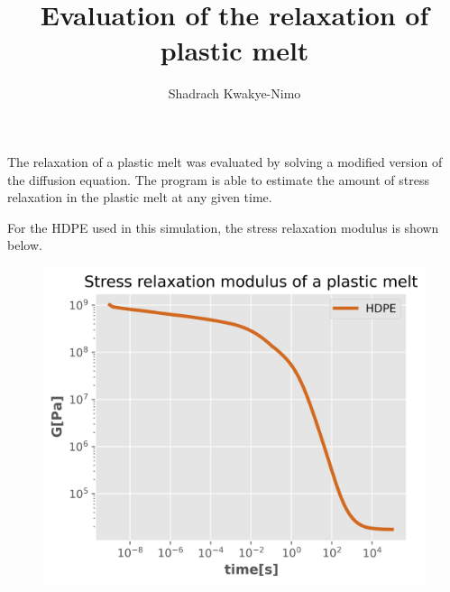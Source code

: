 \documentclass{beamer}
\author{Shadrach Kwakye-Nimo}
\title{Evaluation of the relaxation of plastic melt}
\begin{document}
\begin{frame}
\titlepage
\end{frame}


\begin{frame}
The relaxation of a plastic melt was evaluated by solving a modified version of the diffusion equation. The program is able to estimate the amount of stress relaxation in the plastic melt at any given time. 
\end{frame}

\begin{frame}
For the HDPE used in this simulation, the stress relaxation modulus is shown below.
\begin{figure}
\includegraphics[scale=0.7]{figures/relaxation.png}
\end{figure}

\end{frame}
\end{document}
